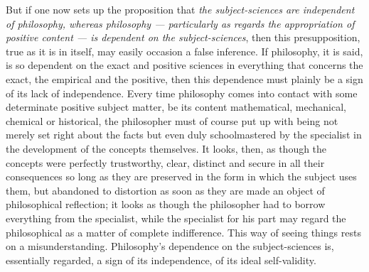 \documentclass[12pt,a4paper]{book}
\begin{document}
But if one now sets up the proposition that \emph{the subject-sciences are
independent of philosophy, whereas philosophy --- particularly as regards the
appropriation of positive content --- is dependent on the subject-sciences},
then this presupposition, true as it is in itself, may easily occasion a false
inference. If philosophy, it is said, is so dependent on the exact and positive
sciences in everything that concerns the exact, the empirical and the positive,
then this dependence must plainly be a sign of its lack of independence. Every
time philosophy comes into contact with some determinate positive subject
matter, be its content mathematical, mechanical, chemical or historical, the
philosopher must of course put up with being not merely set right about the
facts but even duly schoolmastered by the specialist in the development of the
concepts themselves. It looks, then, as though the concepts were perfectly
trustworthy, clear, distinct and secure in all their consequences so long as
they are preserved in the form in which the subject uses them, but abandoned to
distortion as soon as they are made an object of philosophical reflection; it
looks as though the philosopher had to borrow everything from the specialist,
while the specialist for his part may regard the philosophical as a matter of
complete indifference. This way of seeing things rests on a misunderstanding.
Philosophy's dependence on the subject-sciences is, essentially regarded, a
sign of its independence, of its ideal self-validity.
\end{document}
